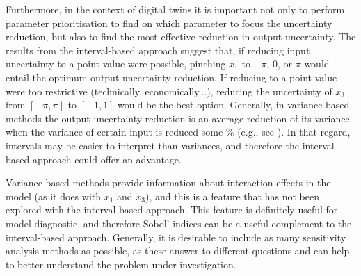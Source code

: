 \documentclass[twocolumn]{rps-esrel2022}
\begin{document}
Furthermore, in the context of digital twins it is important not only to perform parameter prioritisation to find on which parameter to focus the uncertainty reduction, but also to find the most effective reduction in output uncertainty.
The results from the interval-based approach suggest that, if reducing input uncertainty to a point value were possible, pinching
$x_1$ to $-\pi$, $0$, or $\pi$ would entail the optimum output uncertainty reduction.
If reducing to a point value were too restrictive (technically, economically...), reducing the uncertainty of $x_3$ from $[-\pi,\pi]$
to $[-1,1]$ would be the best option.
Generally, in variance-based methods the output uncertainty reduction is an average reduction of its variance when the variance of certain input
is reduced some \% (e.g., see \cite{allaire2012variance}).
In that regard, intervals may be easier to interpret than variances, and therefore the interval-based approach could offer an advantage.

Variance-based methods provide information about interaction effects in the model (as it does with $x_1$ and $x_3$),
and this is a feature that has not been explored with the interval-based approach.
This feature is definitely useful for model diagnostic, and therefore Sobol' indices can be a useful complement to the
interval-based approach.
Generally, it is desirable to include as many sensitivity analysis methods as possible, as these answer to different questions
and can help to better understand the problem under investigation.

\end{document}

